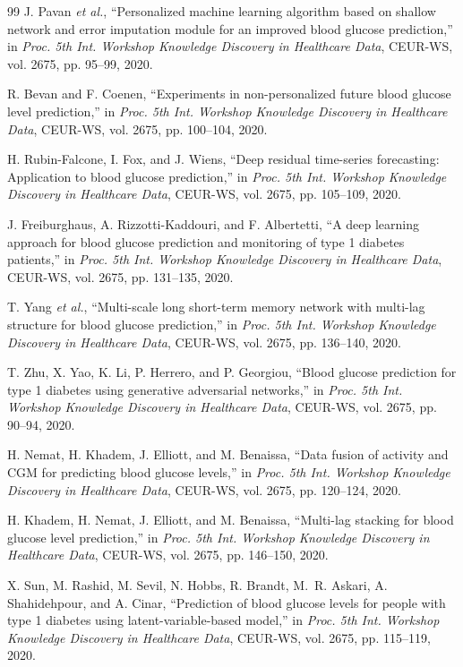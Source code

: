 \documentclass[journal]{IEEEtran}
\begin{document}
\begin{thebibliography}{99}
 J. Pavan \emph{et al.}, ``Personalized machine learning algorithm based on shallow network and error imputation module for an improved blood glucose prediction,'' in \emph{Proc. 5th Int. Workshop Knowledge Discovery in Healthcare Data}, CEUR-WS, vol. 2675, pp. 95--99, 2020.

 R. Bevan and F. Coenen, ``Experiments in non-personalized future blood glucose level prediction,'' in \emph{Proc. 5th Int. Workshop Knowledge Discovery in Healthcare Data}, CEUR-WS, vol. 2675, pp. 100--104, 2020.

 H. Rubin-Falcone, I. Fox, and J. Wiens, ``Deep residual time-series forecasting: Application to blood glucose prediction,'' in \emph{Proc. 5th Int. Workshop Knowledge Discovery in Healthcare Data}, CEUR-WS, vol. 2675, pp. 105--109, 2020.

 J. Freiburghaus, A. Rizzotti-Kaddouri, and F. Albertetti, ``A deep learning approach for blood glucose prediction and monitoring of type 1 diabetes patients,'' in \emph{Proc. 5th Int. Workshop Knowledge Discovery in Healthcare Data}, CEUR-WS, vol. 2675, pp. 131--135, 2020.

 T. Yang \emph{et al.}, ``Multi-scale long short-term memory network with multi-lag structure for blood glucose prediction,'' in \emph{Proc. 5th Int. Workshop Knowledge Discovery in Healthcare Data}, CEUR-WS, vol. 2675, pp. 136--140, 2020.

 T. Zhu, X. Yao, K. Li, P. Herrero, and P. Georgiou, ``Blood glucose prediction for type 1 diabetes using generative adversarial networks,'' in \emph{Proc. 5th Int. Workshop Knowledge Discovery in Healthcare Data}, CEUR-WS, vol. 2675, pp. 90--94, 2020.

 H. Nemat, H. Khadem, J. Elliott, and M. Benaissa, ``Data fusion of activity and CGM for predicting blood glucose levels,'' in \emph{Proc. 5th Int. Workshop Knowledge Discovery in Healthcare Data}, CEUR-WS, vol. 2675, pp. 120--124, 2020.

 H. Khadem, H. Nemat, J. Elliott, and M. Benaissa, ``Multi-lag stacking for blood glucose level prediction,'' in \emph{Proc. 5th Int. Workshop Knowledge Discovery in Healthcare Data}, CEUR-WS, vol. 2675, pp. 146--150, 2020.

 X. Sun, M. Rashid, M. Sevil, N. Hobbs, R. Brandt, M.~R. Askari, A. Shahidehpour, and A. Cinar, ``Prediction of blood glucose levels for people with type 1 diabetes using latent-variable-based model,'' in \emph{Proc. 5th Int. Workshop Knowledge Discovery in Healthcare Data}, CEUR-WS, vol. 2675, pp. 115--119, 2020.


\end{thebibliography}
\end{document}
